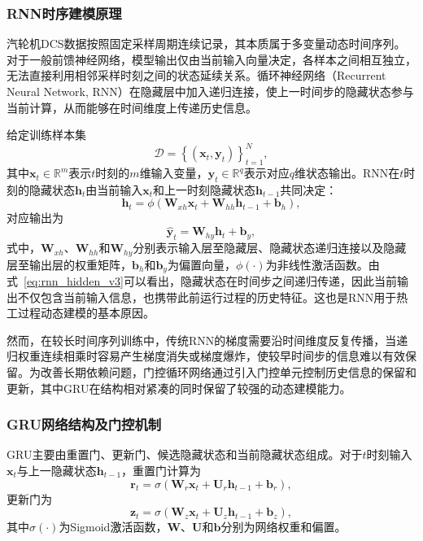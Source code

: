 \subsubsection{RNN时序建模原理}

汽轮机DCS数据按照固定采样周期连续记录，其本质属于多变量动态时间序列。对于一般前馈神经网络，模型输出仅由当前输入向量决定，各样本之间相互独立，无法直接利用相邻采样时刻之间的状态延续关系。循环神经网络（Recurrent Neural Network, RNN）在隐藏层中加入递归连接，使上一时间步的隐藏状态参与当前计算，从而能够在时间维度上传递历史信息。

给定训练样本集
\begin{equation}
    \mathcal{D}=\left\{\left(\mathbf{x}_t,\mathbf{y}_t\right)\right\}_{t=1}^{N},
\end{equation}
其中$\mathbf{x}_t\in\mathbb{R}^{m}$表示$t$时刻的$m$维输入变量，$\mathbf{y}_t\in\mathbb{R}^{q}$表示对应$q$维状态输出。RNN在$t$时刻的隐藏状态$\mathbf{h}_t$由当前输入$\mathbf{x}_t$和上一时刻隐藏状态$\mathbf{h}_{t-1}$共同决定：
\begin{equation}
    \mathbf{h}_t=\phi\left(
    \mathbf{W}_{xh}\mathbf{x}_t+
    \mathbf{W}_{hh}\mathbf{h}_{t-1}+
    \mathbf{b}_h\right),
    \label{eq:rnn_hidden_v3}
\end{equation}
对应输出为
\begin{equation}
    \hat{\mathbf{y}}_t=
    \mathbf{W}_{hy}\mathbf{h}_t+\mathbf{b}_y,
    \label{eq:rnn_output_v3}
\end{equation}
式中，$\mathbf{W}_{xh}$、$\mathbf{W}_{hh}$和$\mathbf{W}_{hy}$分别表示输入层至隐藏层、隐藏状态递归连接以及隐藏层至输出层的权重矩阵，$\mathbf{b}_h$和$\mathbf{b}_y$为偏置向量，$\phi(\cdot)$为非线性激活函数。由式~\eqref{eq:rnn_hidden_v3}可以看出，隐藏状态在时间步之间递归传递，因此当前输出不仅包含当前输入信息，也携带此前运行过程的历史特征。这也是RNN用于热工过程动态建模的基本原因。

然而，在较长时间序列训练中，传统RNN的梯度需要沿时间维度反复传播，当递归权重连续相乘时容易产生梯度消失或梯度爆炸，使较早时间步的信息难以有效保留。为改善长期依赖问题，门控循环网络通过引入门控单元控制历史信息的保留和更新，其中GRU在结构相对紧凑的同时保留了较强的动态建模能力\cite{Cho2014GRU}。

\subsubsection{GRU网络结构及门控机制}

GRU主要由重置门、更新门、候选隐藏状态和当前隐藏状态组成。对于$t$时刻输入$\mathbf{x}_t$与上一隐藏状态$\mathbf{h}_{t-1}$，重置门计算为
\begin{equation}
    \mathbf{r}_t=
    \sigma\left(
    \mathbf{W}_r\mathbf{x}_t+
    \mathbf{U}_r\mathbf{h}_{t-1}+
    \mathbf{b}_r\right),
    \label{eq:gru_reset_v3}
\end{equation}
更新门为
\begin{equation}
    \mathbf{z}_t=
    \sigma\left(
    \mathbf{W}_z\mathbf{x}_t+
    \mathbf{U}_z\mathbf{h}_{t-1}+
    \mathbf{b}_z\right),
    \label{eq:gru_update_v3}
\end{equation}
其中$\sigma(\cdot)$为Sigmoid激活函数，$\mathbf{W}$、$\mathbf{U}$和$\mathbf{b}$分别为网络权重和偏置。

